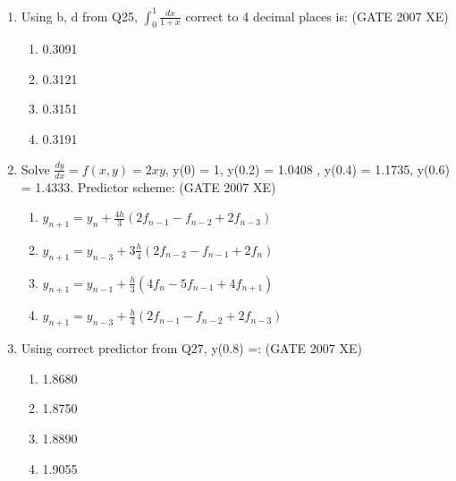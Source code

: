 \documentclass[journal,cmex10]{IEEEtran}
\theoremstyle{remark}
\numberwithin{equation}{enumi}
\numberwithin{figure}{enumi}
\begin{document}
\begin{enumerate}[label=\arabic*)]
    \item Using b, d  from Q25, $\int_0^1 \frac{dx}{1+x}$ correct to 4 decimal places is:
    \hfill{(GATE 2007 XE)}
    \begin{multicols}{4}
    \begin{enumerate}
        \item 0.3091
        \item 0.3121
        \item 0.3151
        \item 0.3191
    \end{enumerate}
\end{multicols}


    \item Solve $\frac{dy}{dx} = f(x,y) = 2xy$, y(0) = 1, y(0.2) = 1.0408 , y(0.4) = 1.1735, y(0.6) = 1.4333. Predictor scheme:
    \hfill{(GATE 2007 XE)}
    \begin{multicols}{2}
    \begin{enumerate}
        \item $y_{n+1} = y_n + \frac{4h}{3} (2f_{n-1} - f_{n-2} + 2f_{n-3})$\\
     
        \item $y_{n+1} = y_{n-3} + 3\frac{h}{4} (2f_{n-2} - f_{n-1} + 2f_n)$\\
      
        \item $y_{n+1} = y_{n-1} + \frac{h}{3} (4f_n - 5f_{n-1} + 4f_{n+1}) $\\
        
        \item $y_{n+1} = y_{n-3} + \frac{h}{4} (2f_{n-1} - f_{n-2} + 2f_{n-3})$\\
    \end{enumerate}
\end{multicols}

    \item Using correct predictor from Q27, y(0.8) =:
    \hfill{(GATE 2007 XE)}
    \begin{multicols}{4}
    \begin{enumerate}
        \item 1.8680
        \item 1.8750
        \item 1.8890
        \item 1.9055
    \end{enumerate}
\end{multicols}

\end{enumerate}
\end{document}
